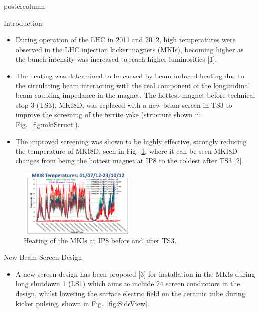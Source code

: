 \documentclass[final,hyperref={pdfpagelabels=false}]{beamer}
\begin{document}
\begin{frame}
\begin{columns}
\begin{column}{.49\textwidth}
\begin{beamercolorbox}[center,wd=\textwidth]{postercolumn}
\begin{minipage}[T]{.95\textwidth}
{\begin{block}{Introduction}
{\begin{figure}
\end{figure}

	\begin{itemize}
	\item{During operation of the LHC in 2011 and 2012, high temperatures were observed in the LHC injection kicker magnets (MKIs), becoming higher as the bunch intensity was increased to reach higher luminosities [1].}
	\item{The heating was determined to be caused by beam-induced heating due to the circulating beam interacting with the real component of the longitudinal beam coupling impedance in the magnet. The hottest magnet before technical stop 3 (TS3), MKI8D, was replaced with a new beam screen in TS3 to improve the screening of the ferrite yoke (structure shown in Fig.~\ref{fig:mkiStruct}).}
	\item{The improved screening was shown to be highly effective, strongly reducing the temperature of MKI8D, seen in Fig.~\ref{fig:HeatingPt8}, where it can be seen MKI8D changes from being the hottest magnet at IP8 to the coldest after TS3 [2].}

	\end{itemize}
\begin{figure}
\includegraphics[width=0.5\textwidth]{figures/mki8-temps-post-ts3.png}
\caption{Heating of the MKIs at IP8 before and after TS3.}
\label{fig:HeatingPt8}
\end{figure}
}
	\end{block}
 \vfill
\begin{block}{New Beam Screen Design}
\small{
\begin{itemize}
\item{A new screen design has been proposed [3] for installation in the MKIs during long shutdown 1 (LS1) which aims to include 24 screen conductors in the design, whilst lowering the surface electric field on the ceramic tube during kicker pulsing, shown in Fig.~\ref{fig:SideView}.}





\end{itemize}}
\end{block}}
\end{minipage}
\end{beamercolorbox}
\end{column}
\end{columns}
\end{frame}
\end{document}
